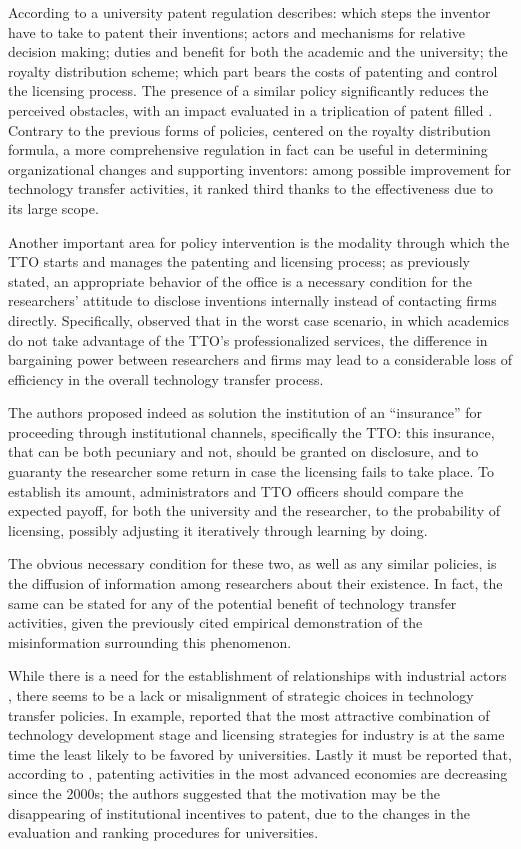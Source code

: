 According to \citet{Baldini2007} a university patent regulation describes: which steps the inventor have to take to patent their inventions; actors and mechanisms for relative decision making; duties and benefit for both the academic and the university; the royalty distribution scheme; which part bears the costs of patenting and control the licensing process. The presence of a similar policy significantly reduces the perceived obstacles, with an impact evaluated in a triplication of patent filled \citep{Baldini2006,Baldini2007}. Contrary to the previous forms of policies, centered on the royalty distribution formula, a more comprehensive regulation in fact can be useful in determining organizational changes and supporting inventors: among possible improvement for technology transfer activities, it ranked third thanks to the effectiveness due to its large scope. 

Another important area for policy intervention is the modality through which the TTO starts and manages the patenting and licensing process; as previously stated, an appropriate behavior of the office is a necessary condition for the researchers' attitude to disclose inventions internally instead of contacting firms directly. Specifically, \citet{Panagopoulos2013} observed that in the worst case scenario, in which academics do not take advantage of the TTO's professionalized services, the difference in bargaining power between researchers and firms may lead to a considerable loss of efficiency in the overall technology transfer process.

The authors proposed indeed as solution the institution of an \enquote{insurance} for proceeding through institutional channels, specifically the TTO: this insurance, that can be both pecuniary and not, should be granted on disclosure, and to guaranty the researcher some return in case the licensing fails to take place. To establish its amount, administrators and TTO officers should compare the expected payoff, for both the university and the researcher, to the probability of licensing, possibly adjusting it iteratively through learning by doing.

The obvious necessary condition for these two, as well as any similar policies, is the diffusion of information among researchers about their existence. In fact, the same can be stated for any of the potential benefit of technology transfer activities, given the previously cited empirical demonstration of the misinformation surrounding this phenomenon. 

While there is a need for the establishment of relationships with industrial actors \citep{Baldini2007}, there seems to be a lack or misalignment of strategic choices in technology transfer policies. In example, \citet{Phan2005} reported that the most attractive combination of technology development stage and licensing strategies for industry is at the same time the least likely to be favored by universities. Lastly it must be reported that, according to \citet{Leydesdorff2010}, patenting activities in the most advanced economies are decreasing since the 2000s; the authors suggested that the motivation may be the disappearing of institutional incentives to patent, due to the changes in the evaluation and ranking procedures for universities.

